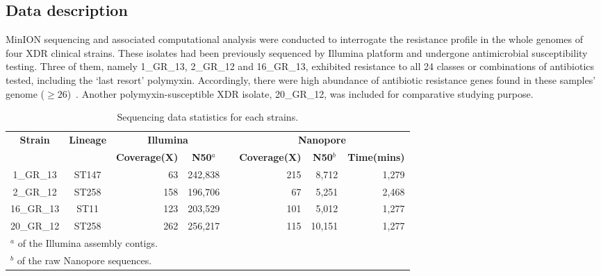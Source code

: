 \subsection{Data description}
MinION sequencing and associated computational analysis were conducted to interrogate the resistance profile in the whole genomes of four XDR clinical \kp{} strains. These isolates had been previously sequenced by Illumina platform and undergone antimicrobial susceptibility testing.
Three of them, namely 1\_GR\_13, 2\_GR\_12 and 16\_GR\_13, exhibited resistance to all 24 classes or combinations of antibiotics tested, including the `last resort' polymyxin. Accordingly, there were high abundance of antibiotic resistance genes found in these samples' genome ($\geq 26$)~\cite{Miranda2018}. 
Another polymyxin-susceptible XDR isolate, 20\_GR\_12, was included for comparative studying purpose.
\begin{table}[!hpt]
\centering
\caption{Sequencing data statistics for each \kp{} strains.}
\label{tab:assers_stats}
\begin{tabular}{ccrrlrrr}
\hline
\toprule
\multirow{2}{*}{\textbf{Strain}} & \multirow{2}{*}{\textbf{Lineage}} & \multicolumn{2}{c}{\textbf{Illumina}} & & \multicolumn{3}{c}{\textbf{Nanopore}}\\ 
\cline{3-4} 
\cline{6-8}
&   & \multicolumn{1}{c}{\textbf{Coverage(X)}} & \multicolumn{1}{c}{\textbf{N50$^a$}} & & \multicolumn{1}{c}{\textbf{Coverage(X)}} & \multicolumn{1}{c}{\textbf{N50$^b$}} & \textbf{Time(mins)} \\ 
\hline
\rowcolor{Gray}                                 
1\_GR\_13   & ST147   & 63   & 242,838  & & 215  & 8,712  & 1,279 \\
2\_GR\_12   & ST258   & 158  & 196,706  & & 67   & 5,251  & 2,468 \\ 
\rowcolor{Gray}
16\_GR\_13  & ST11    & 123  & 203,529  & & 101  & 5,012  & 1,277 \\ 
20\_GR\_12  & ST258   & 262  & 256,217  & & 115  & 10,151 & 1,277 \\ 
\hline
\multicolumn{7}{l}{\small{$^a$ of the Illumina assembly contigs.}}\\
\multicolumn{7}{l}{\small{$^b$ of the raw Nanopore sequences.}}
\end{tabular}
\end{table}

